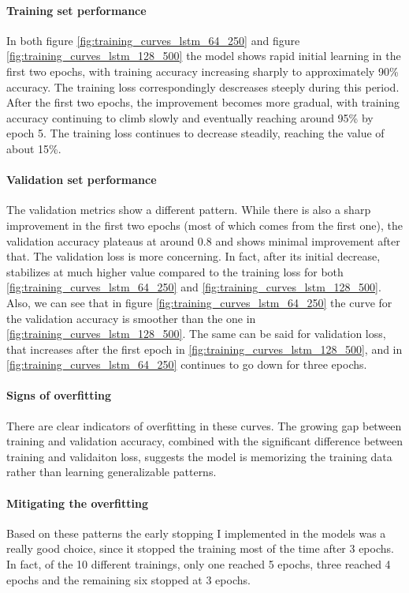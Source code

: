 \documentclass{article}
\begin{document}
\paragraph{Training set performance}
In both figure \ref{fig:training_curves_lstm_64_250} and figure \ref{fig:training_curves_lstm_128_500} the model shows rapid initial learning in the first two epochs, with training accuracy increasing sharply to approximately 90\% accuracy.
The training loss correspondingly descreases steeply during this period.
After the first two epochs, the improvement becomes more gradual, with training accuracy continuing to climb slowly and eventually reaching around 95\% by epoch 5.
The training loss continues to decrease steadily, reaching the value of about 15\%.

\paragraph{Validation set performance}
The validation metrics show a different pattern.
While there is also a sharp improvement in the first two epochs (most of which comes from the first one), the validation accuracy plateaus at around 0.8 and shows minimal improvement after that.
The validation loss is more concerning.
In fact, after its initial decrease, stabilizes at much higher value compared to the training loss for both \ref{fig:training_curves_lstm_64_250} and \ref{fig:training_curves_lstm_128_500}.
Also, we can see that in figure \ref{fig:training_curves_lstm_64_250} the curve for the validation accuracy is smoother than the one in \ref{fig:training_curves_lstm_128_500}.
The same can be said for validation loss, that increases after the first epoch in \ref{fig:training_curves_lstm_128_500}, and in \ref{fig:training_curves_lstm_64_250} continues to go down for three epochs.

\paragraph{Signs of overfitting}
There are clear indicators of overfitting in these curves.
The growing gap between training and validation accuracy, combined with the significant difference between training and validaiton loss, suggests the model is memorizing the training data rather than learning generalizable patterns.

\paragraph{Mitigating the overfitting}
Based on these patterns the early stopping I implemented in the models was a really good choice, since it stopped the training most of the time after 3 epochs.
In fact, of the 10 different trainings, only one reached 5 epochs, three reached 4 epochs and the remaining six stopped at 3 epochs.
\end{document}
